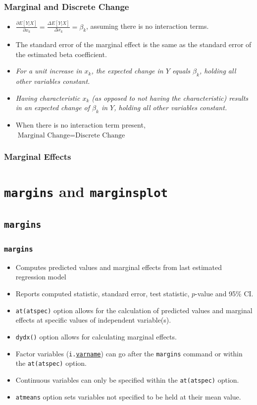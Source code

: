 \documentclass{beamer}
\begin{document}
\begin{frame}
	\frametitle{Marginal and Discrete Change}
		\begin{itemize}
			\item $\frac{\partial E[Y|X]}{\partial x_{k}}=\frac{\Delta E[Y|X]}{\Delta x_{k}}=\beta_{k}$, assuming there is no interaction terms.
			\item The standard error of the marginal effect is the same as the standard error of the estimated beta coefficient.
			\item \textit{For a unit increase in $x_{k}$, the expected change in $Y$ equals $\beta_{k}$, holding all other variables constant.}
			\item \textit{Having characteristic $x_{k}$ (as opposed to not having the characteristic) results in an expected change of $\beta_{k}$ in $Y$, holding all other variables constant.}
			\item When there is no interaction term present, $\mbox{Marginal Change}=\mbox{Discrete Change}$
		\end{itemize}
\end{frame}

\begin{frame}
	\frametitle{Marginal Effects}
\end{frame}

\section{\texttt{margins} and \texttt{marginsplot}}
\subsection{\texttt{margins}}

\begin{frame}
	\frametitle{\texttt{margins}}
	\begin{itemize}
		\item Computes predicted values and marginal effects from last estimated regression model
		\item Reports computed statistic, standard error, test statistic, $p$-value and 95\% CI.
		\item \texttt{at(atspec)} option allows for the calculation of predicted values and marginal effects at specific values of independent variable(s).
		\item \texttt{dydx()} option allows for calculating marginal effects.
		\item Factor variables (\texttt{i.\underline{varname}}) can go after the \texttt{margins} command or within the \texttt{at(atspec)} option.
		\item Continuous variables can only be specified within the \texttt{at(atspec)} option.
		\item \texttt{atmeans} option sets variables not specified to be held at their mean value.
	\end{itemize}
\end{frame}
\end{document}
